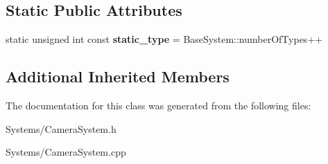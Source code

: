 \subsection*{Static Public Attributes}
\begin{DoxyCompactItemize}
\item 
\mbox{\label{classCameraSystem_a321e590f18ebbd92290c3922d5c18924}} 
static unsigned int const {\bfseries static\+\_\+type} = Base\+System\+::number\+Of\+Types++
\end{DoxyCompactItemize}
\subsection*{Additional Inherited Members}


The documentation for this class was generated from the following files\+:\begin{DoxyCompactItemize}
\item 
Systems/Camera\+System.\+h\item 
Systems/Camera\+System.\+cpp\end{DoxyCompactItemize}
